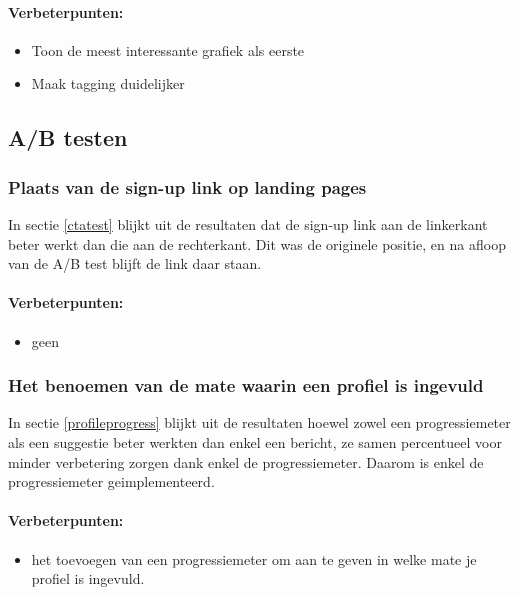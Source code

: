 \documentclass[a4paper, 10pt, pdftex]{report}
\begin{document}
    \paragraph{\textbf{Verbeterpunten:}}
      \begin{itemize}
        \item Toon de meest interessante grafiek als eerste
        \item Maak tagging duidelijker
      \end{itemize}

    \subsection{A/B testen}
      \subsubsection{Plaats van de sign-up link op landing pages}
        In sectie \ref{ctatest} blijkt uit de resultaten dat de sign-up link aan de linkerkant beter werkt dan die aan de rechterkant. Dit was de originele positie, en na afloop van de A/B test blijft de link daar staan.

    \paragraph{\textbf{Verbeterpunten:}}
      \begin{itemize}
        \item geen
      \end{itemize}

      \subsubsection{Het benoemen van de mate waarin een profiel is ingevuld}
        In sectie \ref{profileprogress} blijkt uit de resultaten hoewel zowel een progressiemeter als een suggestie beter werkten dan enkel een bericht, ze samen percentueel voor minder verbetering zorgen dank enkel de progressiemeter. Daarom is enkel de progressiemeter geimplementeerd.

    \paragraph{\textbf{Verbeterpunten:}}
      \begin{itemize}
        \item het toevoegen van een progressiemeter om aan te geven in welke mate je profiel is ingevuld.
      \end{itemize}
\end{document}
